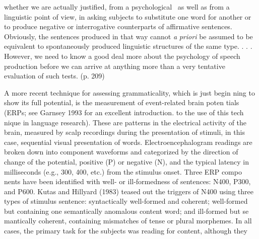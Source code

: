 \begin{styleTextbody}
whether we are actually justified, from a psychological \ as well as from a linguistic point of view, in asking subjects to substitute one word for another or to produce negative or interrogative counterparts of affirmative sentences. Obviously, the sentences produced in that way cannot \textit{a}\textit{ }\textit{priori}\textit{ }be assumed to be equivalent to spontaneously produced linguistic structures of the same type. . . . However, we need to know a good deal more about the psychology of speech production before we can arrive at anything more than a very tentative evaluation of such tests. (p. 209)
\end{styleTextbody}


\begin{styleTextbody}
A more recent technique for assessing grammaticality, which is just begin\- ning to show its full potential, is the measurement of event-related brain poten\- tials (ERPs; see Garnsey 1993 for an excellent introduction. to the use of this tech\- nique in language research). These are patterns in the electrical activity of the brain, measured by scalp recordings during the presentation of stimuli, in this case, sequential visual presentation of words. Electroencephalogram readings are broken down into component waveforms and categorized by the direction of change of the potential, positive (P) or negative (N), and the typical latency in milliseconds (e.g., 300, 400, etc.) from the stimulus onset. Three ERP compo\- nents have been identified with well- or ill-formedness of sentences: N400, P300, and P600. Kutas and Hillyard (1983) teased out the triggers of N400 using three types of stimulus sentence: syntactically well-formed and coherent; well-formed but containing one semantically anomalous content word; and ill-formed but se\- mantically coherent, containing mismatches of tense or plural morphemes. In all cases, the primary task for the subjects was reading for content, although they
\end{styleTextbody}


